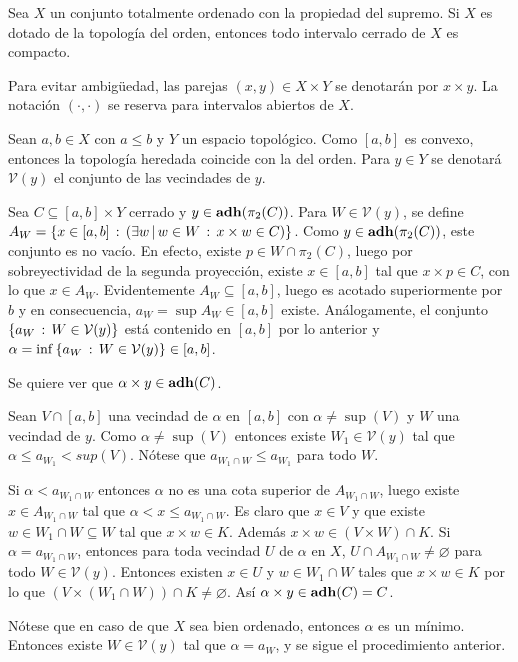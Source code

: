\begin{Teo}
  Sea $X$ un conjunto totalmente ordenado con la propiedad del supremo. Si $X$
  es dotado de la topología del orden, entonces todo intervalo cerrado de $X$
  es compacto.
\end{Teo}
\begin{Demo}
  Para evitar ambigüedad, las parejas $(x,y)\in X\times Y$ se denotarán por $x\times y$.
  La notación $(\cdot,\cdot)$ se reserva para intervalos abiertos de $X$.

  Sean $a,b\in X$ con $a\leq b$ y $Y$ un espacio topológico. Como $[a,b]$ es convexo,
  entonces la topología heredada coincide con la del orden. Para $y\in Y$ se denotará
  $\mathcal{V}(y)$ el conjunto de las vecindades de $y$.

  Sea $C\subseteq[a,b]\times Y$ cerrado y $y\in\operatorname{\mathrm{\mathbf{adh}}}(\pi_2(C))$. Para $W\in\mathcal{V}(y)$,
  se define $A_W=\set{x\in[a,b]}{\Exists{w}[w\in W]{x\times w\in C}}$. Como
  $y\in\operatorname{\mathrm{\mathbf{adh}}}(\pi_2(C))$, este conjunto es no vacío. En efecto, existe $p\in W\cap\pi_2(C)$,
  luego por sobreyectividad de la segunda proyección, existe $x\in [a,b]$ tal que
  $x\times p\in C$, con lo que $x\in A_W$. Evidentemente $A_W\subseteq[a,b]$,
  luego es acotado superiormente por $b$ y en consecuencia, $a_W=\sup A_W\in [a,b]$ existe.
  Análogamente, el conjunto $\left\{a_W\,:\,W\in\mathcal{V}(y)\right\}$ está contenido en $[a,b]$
  por lo anterior y $\alpha=\inf\left\{a_W\,:\,W\in\mathcal{V}(y)\right\}\in[a,b]$.

  Se quiere ver que $\alpha\times y\in\operatorname{\mathrm{\mathbf{adh}}}(C)$.

  Sean $V\cap [a,b]$ una vecindad de $\alpha$ en $[a,b]$ con $\alpha \neq \sup(V)$
  y $W$ una vecindad de $y$. Como $\alpha \neq \sup(V)$ entonces existe $W_1 \in \mathcal{V}(y)$
  tal que $\alpha \leq a_{W_1} < sup(V)$. Nótese que $a_{W_1\cap W}\leq a_{W_1}$ para todo $W$.

  Si $\alpha < a_{W_1\cap W}$ entonces $\alpha$ no es una cota superior de $A_{W_1\cap W}$,
  luego existe $x\in A_{W_1\cap W}$ tal que $\alpha < x \leq a_{W_1\cap W}$. Es claro que 
  $x \in V$ y que existe $w \in W_1\cap W \subseteq W$ tal que $x\times w \in K$. 
  Además $x\times w \in (V\times W)\cap K$. 
  Si $\alpha = a_{W_1\cap W}$, entonces para toda vecindad $U$ de $\alpha$ en $X$, 
  $U\cap A_{W_1\cap W} \neq \varnothing$ para todo $W \in \mathcal{V}(y)$. Entonces existen
  $x \in U$ y $w\in W_1\cap W$ tales que $x\times w \in K$ por lo que 
  $(V\times (W_1\cap W))\cap K\neq\varnothing$. Así $\alpha \times y \in \operatorname{\mathrm{\mathbf{adh}}}(C)=C$.

  Nótese que en caso de que $X$ sea bien ordenado, entonces $\alpha$ es un mínimo. Entonces 
  existe $W \in \mathcal{V}(y)$ tal que $\alpha = a_W$, y se sigue el procedimiento anterior.
\end{Demo}